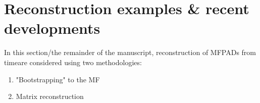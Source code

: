 \section{Reconstruction examples & recent developments}

In this section/the remainder of the manuscript, reconstruction of MFPADs from timeare considered using two methodologies:

\begin{enumerate}
\item "Bootstrapping" to the MF
\item Matrix reconstruction
\end{enumerate}